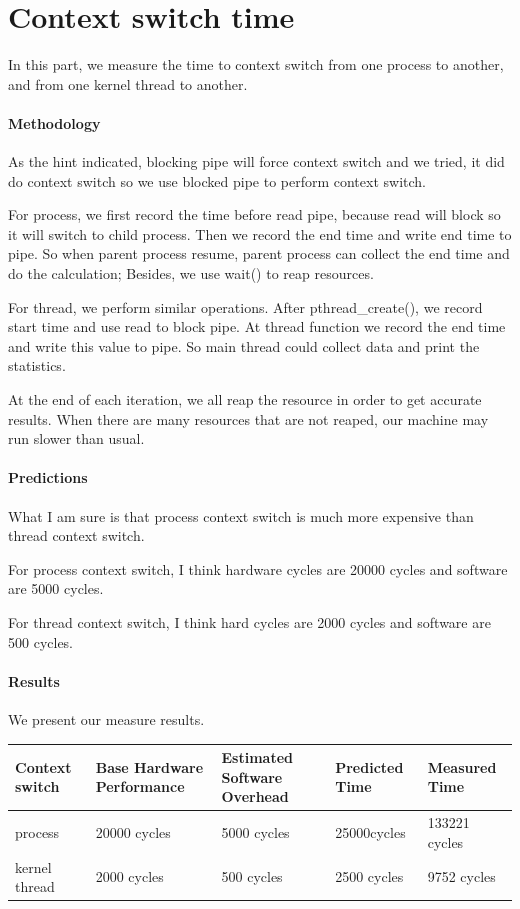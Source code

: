 \section{Context switch time}
In this part, we measure the time to context switch from one process to another, and from one kernel thread to another.

\paragraph{Methodology}
As the hint indicated, blocking pipe will force context switch and we tried, it did do context switch so we use blocked pipe to perform context switch.

For process, we first record the time before read pipe, because read will block so it will switch to child process. Then we record the end time and write end time to pipe. So when parent process resume, parent process can collect the end time and do the calculation; Besides, we use wait() to reap resources.

For thread, we perform similar operations. After pthread\_create(), we record start time and use read to block pipe. At thread function we record the end time and write this value to pipe. So main thread could collect data and print the statistics.

At the end of each iteration, we all reap the resource in order to get accurate results. When there are many resources that are not reaped, our machine may run slower than usual.

\paragraph{Predictions}
What I am sure is that process context switch is much more expensive than thread context switch.

For process context switch, I think hardware cycles are 20000 cycles and software are 5000 cycles.

For thread context switch, I think hard cycles are 2000 cycles and software are 500 cycles.

\paragraph{Results}
We present our measure results.

\begin{center}
\begin{tabular}{| p{3cm} | p{3cm} | p{3cm} | p{3cm} | p{3cm} |}
Context switch              & Base Hardware Performance  & Estimated Software Overhead  & Predicted Time  & Measured Time   \\
\hline
process & 20000 cycles& 5000 cycles& 25000cycles & 133221 cycles \\
kernel thread    & 2000 cycles& 500 cycles& 2500 cycles& 9752 cycles\\
\end{tabular}
\end{center}


